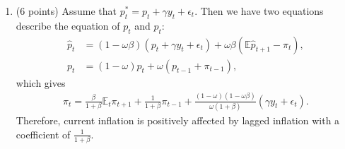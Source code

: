 \documentclass[12pt]{article}
\begin{document}
\begin{enumerate}
\begin{align*}
        &= (1-\omega\beta)p^*_t + \omega\beta\left(\mathbb{E}\hat{p}_{t+1} - \pi_t\right).
    \end{align*}
    Evidenced by last equation, the optimal price $\hat{p}_t$ is a weighted avergae between target price $p^*_t$ and expected optimal price $\mathbb{E}_t\hat{p}_{t+1}$ adjusted by the inflation $\pi_t$.
    \item (6 points) Assume that $p^*_t = p_t + \gamma y_t + \epsilon_t$. Then we have two equations describe the equation of $p_t$ and $\hat{p}_t$:
    \begin{align*}
        \hat{p}_t &= (1-\omega\beta)(p_t + \gamma y_t + \epsilon_t) + \omega\beta\left(\mathbb{E}\hat{p}_{t+1} - \pi_t\right),\\
        p_t &= (1-\omega)\hat{p}_t + \omega (p_{t-1} + \pi_{t-1}),
    \end{align*}
    which gives
    \begin{align*}
        \pi_t = \frac{\beta}{1+\beta} \mathbb{E}_t \pi_{t+1} + \frac{1}{1+\beta}\pi_{t-1} + \frac{(1-\omega)(1-\omega\beta)}{\omega(1+\beta)}(\gamma y_t + \epsilon_t).
    \end{align*}
    Therefore, current inflation is positively affected by lagged inflation with a coefficient of $\frac{1}{1+\beta}$.
\end{enumerate}
\end{document}

